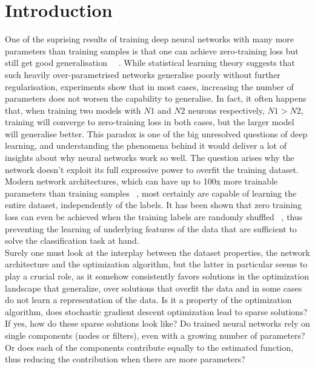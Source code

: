 \setlength\parindent{0pt}

\section{Introduction}
One of the suprising results of training deep neural networks with many more parameters than training samples is that one can achieve zero-training loss but still get good generalisation ~~\autocite{neyshabur2018towards}. While statistical learning theory suggests that such heavily over-parametrised networks generalise poorly without further regularisation, experiments show that in most cases, increasing the number of parameters does not worsen the capability to generalise. In fact, it often happens that, when training two models with $N1$ and $N2$ neurons respectively, $N1 > N2$, training will converge to zero-training loss in both cases, but the larger model will generalise better. This paradox is one of the big unresolved questions of deep learning, and understanding the phenomena behind it would deliver a lot of insights about why neural networks work so well. The question arises why the network doesn't exploit its full expressive power to overfit the training dataset. Modern network architectures, which can have up to 100x more trainable parameters than training samples ~\autocite{zagoruyko2016wide}, most certainly are capable of learning the entire dataset, independently of the labels. It has been shown that zero training loss can even be achieved when the training labels are randomly shuffled ~\autocite{zhang2016understanding}, thus preventing the learning of underlying features of the data that are sufficient to solve the classification task at hand. \\

Surely one must look at the interplay between the dataset properties, the network architecture and the optimization algorithm, but the latter in particular seems to play a crucial role, as it somehow consistently favors solutions in the optimization landscape that generalize, over solutions that overfit the data and in some cases do not learn a representation of the data. Is it a property of the optimization algorithm, does stochastic gradient descent optimization lead to sparse solutions? If yes, how do these sparse solutions look like? Do trained neural networks rely on single components (nodes or filters), even with a growing number of parameters? Or does each of the components contribute equally to the estimated function, thus reducing the contribution when there are more parameters? \\

